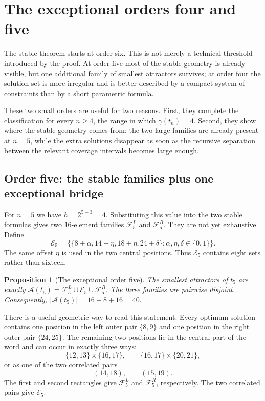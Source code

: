\documentclass[10pt,a4paper]{article}
\newtheorem{proposition}[theorem]{Proposition}
\theoremstyle{definition}\newtheorem{definition}[theorem]{Definition}
\theoremstyle{remark}\newtheorem{remark}[theorem]{Remark}
\newcommand{\Acal}{\mathcal{A}}
\newcommand{\FL}{\mathcal{F}^{L}}
\newcommand{\FR}{\mathcal{F}^{R}}
\begin{document}
\section{The exceptional orders four and five}
\label{sec:exceptional-orders}

The stable theorem starts at order six.  This is not merely a technical threshold introduced by the proof.  At order five most of the stable geometry is already visible, but one additional family of smallest attractors survives; at order four the solution set is more irregular and is better described by a compact system of constraints than by a short parametric formula.

These two small orders are useful for two reasons.  First, they complete the classification for every $n\ge4$, the range in which $\gamma(t_n)=4$.  Second, they show where the stable geometry comes from: the two large families are already present at $n=5$, while the extra solutions disappear as soon as the recursive separation between the relevant coverage intervals becomes large enough.

\subsection{Order five: the stable families plus one exceptional bridge}
\label{subsec:t5-exceptional}

For $n=5$ we have $h=2^{5-3}=4$.  Substituting this value into the two stable formulas gives two $16$-element families $\FL_5$ and $\FR_5$.  They are not yet exhaustive.  Define
\[
 \mathcal E_5=
 \bigl\{\{8+\alpha,14+\eta,18+\eta,24+\delta\}:
       \alpha,\eta,\delta\in\{0,1\}\bigr\}.
\]
The same offset $\eta$ is used in the two central positions.  Thus $\mathcal E_5$ contains eight sets rather than sixteen.

\begin{proposition}[The exceptional order five]
\label{prop:t5-extended}
The smallest attractors of $t_5$ are exactly
$
 \Acal(t_5)=\FL_5\cup\mathcal E_5\cup\FR_5.
$
The three families are pairwise disjoint.  Consequently,
$
 |\Acal(t_5)|=16+8+16=40.
$
\end{proposition}

There is a useful geometric way to read this statement.  Every optimum solution contains one position in the left outer pair
$
 \{8,9\}
$
and one position in the right outer pair
$
 \{24,25\}.
$
The remaining two positions lie in the central part of the word and can occur in exactly three ways:
\[
 \{12,13\}\times\{16,17\},
 \qquad
 \{16,17\}\times\{20,21\},
\]
or as one of the two correlated pairs
\[
 (14,18),\qquad(15,19).
\]
The first and second rectangles give $\FL_5$ and $\FR_5$, respectively.  The two correlated pairs give $\mathcal E_5$.
\end{document}
